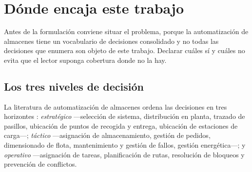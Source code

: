\section{Dónde encaja este trabajo}
\label{sec:posicionamiento}

Antes de la formulación conviene situar el problema, porque la automatización de
almacenes tiene un vocabulario de decisiones consolidado y no todas las
decisiones que enumera son objeto de este trabajo. Declarar cuáles sí y cuáles
no evita que el lector suponga cobertura donde no la hay.

\subsection{Los tres niveles de decisión}

La literatura de automatización de almacenes ordena las decisiones en tres
horizontes \cite{yildirim2023warehouse}: \emph{estratégico} —selección de
sistema, distribución en planta, trazado de pasillos, ubicación de puntos de
recogida y entrega, ubicación de estaciones de carga—; \emph{táctico}
—asignación de almacenamiento, gestión de pedidos, dimensionado de flota,
mantenimiento y gestión de fallos, gestión energética—; y \emph{operativo}
—asignación de tareas, planificación de rutas, resolución de bloqueos y
prevención de conflictos.

